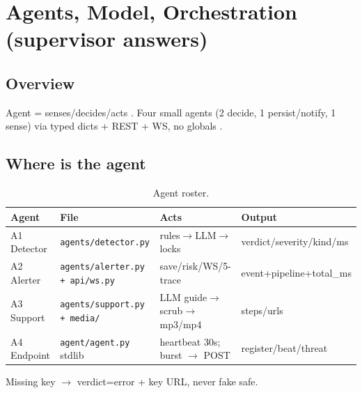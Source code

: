 \documentclass[11pt,a4paper]{article}
\begin{document}
\section{Agents, Model, Orchestration (supervisor answers)}
\subsection{Overview}
Agent = senses/decides/acts \cite{FangHack24,Castro25,AutoGen24}. Four small agents (2 decide, 1 persist/notify, 1 sense) via typed dicts + REST + WS, no globals \cite{AutoGen24,SAGA25,Aegis25}.
\subsection{Where is the agent}
\begin{table}[h]\centering\caption{Agent roster.}\begin{tabular}{@{}llll@{}}\toprule Agent & File & Acts & Output\\\midrule A1 Detector & \texttt{agents/detector.py} & rules$\rightarrow$LLM$\rightarrow$locks & verdict/severity/kind/ms\\
A2 Alerter & \texttt{agents/alerter.py + api/ws.py} & save/risk/WS/5-trace & event+pipeline+total\_ms\\
A3 Support & \texttt{agents/support.py + media/} & LLM guide$\rightarrow$scrub$\rightarrow$mp3/mp4 & steps/urls\\
A4 Endpoint & \texttt{agent/agent.py} stdlib & heartbeat 30s; burst $\rightarrow$ POST & register/beat/threat\\\bottomrule\end{tabular}\end{table}
Missing key $\rightarrow$ verdict=error + key URL, never fake safe.
\end{document}
